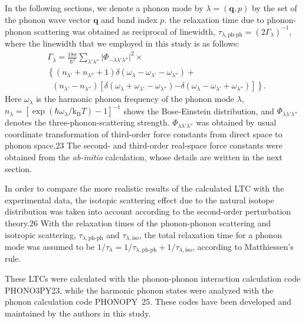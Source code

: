 \documentclass[twocolumn,amsmath,amssymb,a4paper,prb,superscriptaddress,floatfix]{revtex4-1}
\begin{document}
In the following sections, we denote a phonon mode by
$\lambda=(\mathbf{q},p)$ by the set of the phonon wave vector
$\mathbf{q}$ and band index $p$. the relaxation time due to
phonon-phonon scattering was obtained as reciprocal of linewidth,
$\tau_{\lambda,\text{ph-ph}}=(2\Gamma_\lambda)^{-1}$, where the
linewidth that we employed in this study is as follows:
\begin{align}
 \label{eq:linewidth}
 &\Gamma_\lambda = \frac{18\pi}{\hbar^2}
  \sum_{\lambda' \lambda''}
  \bigl|\Phi_{-\lambda\lambda'\lambda''}\bigl|^2 \times \nonumber \\ 
 &\left\{ (n_{\lambda'} + n_{\lambda''}+1) 
   \delta(\omega_\lambda-\omega_{\lambda'}-\omega_{\lambda''}) \right.
   + \nonumber \\ 
 &\;\;(n_{\lambda'}-n_{\lambda''})
  \left[\delta(\omega_\lambda +\omega_{\lambda'}-\omega_{\lambda''})
 \right. 
 \left. -\left. \delta(\omega_\lambda - \omega_{\lambda'}+\omega_{\lambda''})
 \right]\right\}.
\end{align}
Here $\omega_\lambda$ is the harmonic phonon frequency of the phonon
mode $\lambda$,
$n_\lambda=[\exp(\hbar\omega_\lambda/\mathrm{k_B}T)-1]^{-1}$ shows the
Bose-Einstein distribution, and $\Phi_{\lambda\lambda'\lambda''}$
denotes the three-phonon-scattering
strength. $\Phi_{\lambda\lambda'\lambda''}$ was obtained by usual
coordinate transformation of third-order force constants from direct
space to phonon space.23 The second- and third-order real-space force
constants were obtained from the {\it ab-initio} calculation, whose
details are written in the next section.

In order to compare the more realistic results of the calculated LTC
with the experimental data, the isotopic scattering effect due to the
natural isotope distribution was taken into account according to the
second-order perturbation theory.26 With the relaxation times of the
phonon-phonon scattering and isotropic scattering,
$\tau_{\lambda,\text{ph-ph}}$ and $\tau_{\lambda,\text{iso}}$, the total
relaxation time for a phonon mode was assumed to be
$1/\tau_{\lambda} = 1/\tau_{\lambda,\text{ph-ph}} +
1/\tau_{\lambda,\text{iso}}$, according to Matthiessen's rule.

These LTCs were calculated with the phonon-phonon interaction
calculation code PHONO3PY23, while the harmonic phonon states were
analyzed with the phonon calculation code
PHONOPY~\cite{phonopy,Laurent-phph-2011,Laurent-LBTE-2013}25. These codes have been
developed and maintained by the authors in this study.
\end{document}
